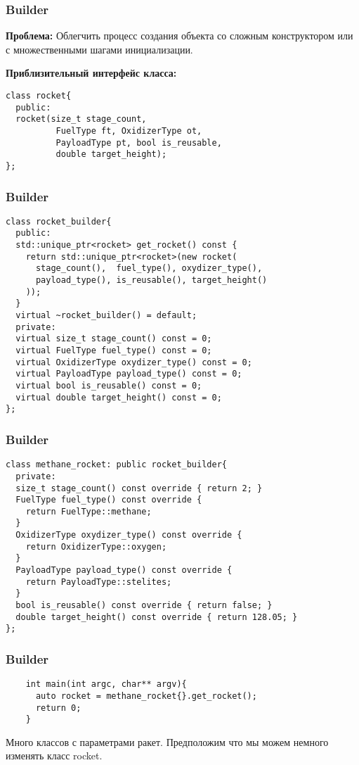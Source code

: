 \begin{frame}[fragile]
  \frametitle{Builder}
  \textbf{Проблема:} Облегчить процесс создания объекта со сложным конструктором или 
  с множественными шагами инициализации. 
  
  \vspace{10pt}
  \bf{Приблизительный интерфейс класса:}
  \begin{verbatim}
class rocket{
  public:
  rocket(size_t stage_count, 
          FuelType ft, OxidizerType ot, 
          PayloadType pt, bool is_reusable, 
          double target_height);
};
  \end{verbatim}
\end{frame}

\begin{frame}[fragile]
  \frametitle{Builder}
  \begin{verbatim}
class rocket_builder{
  public:
  std::unique_ptr<rocket> get_rocket() const {
    return std::unique_ptr<rocket>(new rocket(
      stage_count(),  fuel_type(), oxydizer_type(),
      payload_type(), is_reusable(), target_height()
    ));
  }
  virtual ~rocket_builder() = default;
  private:
  virtual size_t stage_count() const = 0;
  virtual FuelType fuel_type() const = 0;
  virtual OxidizerType oxydizer_type() const = 0;
  virtual PayloadType payload_type() const = 0;
  virtual bool is_reusable() const = 0;
  virtual double target_height() const = 0;
};
  \end{verbatim}
\end{frame}

\begin{frame}[fragile]
  \frametitle{Builder}
  \begin{verbatim}
class methane_rocket: public rocket_builder{
  private:
  size_t stage_count() const override { return 2; }
  FuelType fuel_type() const override { 
    return FuelType::methane; 
  }
  OxidizerType oxydizer_type() const override { 
    return OxidizerType::oxygen; 
  }
  PayloadType payload_type() const override { 
    return PayloadType::stelites; 
  }
  bool is_reusable() const override { return false; }
  double target_height() const override { return 128.05; }
};

  \end{verbatim}
\end{frame}

\begin{frame}[fragile]
  \frametitle{Builder}
  \begin{verbatim}
    int main(int argc, char** argv){
      auto rocket = methane_rocket{}.get_rocket();
      return 0;
    }
  \end{verbatim}

  Много классов с параметрами ракет. Предположим что мы можем немного изменять класс rocket.
\end{frame}

